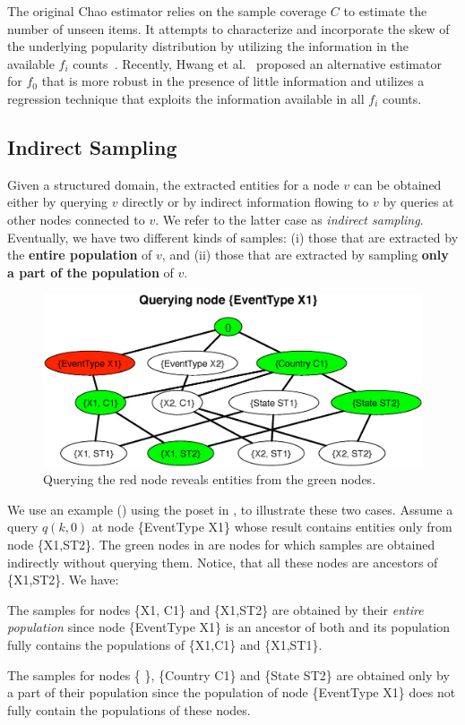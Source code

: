 The original Chao estimator relies on the sample coverage $C$ to estimate the number of unseen items. It attempts to characterize and incorporate the skew of the underlying popularity distribution by utilizing the information in the available $f_i$ counts~\cite{chao:1992}. Recently, Hwang et al.~\cite{hwang:2010} proposed an alternative estimator for $f_0$ that is more robust in the presence of little information and utilizes a regression technique that exploits the information available in all $f_i$ counts.  

\subsection{Indirect Sampling}
\label{sec:indirectsampling}
Given a structured domain, the extracted entities for a node $v$ can be obtained either by querying $v$ directly or by indirect information flowing to $v$ by queries at other nodes connected to $v$. We refer to the latter case as {\em indirect sampling}. Eventually, we have two different kinds of samples: (i) those that are extracted by the {\bf entire population} of $v$, and (ii) those that are extracted by sampling {\bf only a part of the population} of $v$. 
\begin{figure}
	\begin{center}
	\includegraphics[clip,scale=0.32]{figs/exampleQuery.eps}	
	\caption{Querying the red node reveals entities from the green nodes.}
	\label{fig:query}
	\end{center}
\end{figure}
We use an example () using the poset in , to illustrate these two cases. Assume a query $q(k,0)$ at node \{EventType X1\} whose result contains entities only from node \{X1,ST2\}. The green nodes in  are nodes for which samples are obtained indirectly without querying them. Notice, that all these nodes are ancestors of \{X1,ST2\}. We have:
\squishlist
\item The samples for nodes \{X1, C1\} and \{X1,ST2\} are obtained by their {\em entire population} since node \{EventType X1\} is an ancestor of both and its population fully contains the populations of \{X1,C1\} and \{X1,ST1\}. 
\item The samples for nodes \{ \}, \{Country C1\} and \{State ST2\} are obtained only by a part of their population since the population of node \{EventType X1\} does not fully contain the populations of these nodes. 
\squishend

